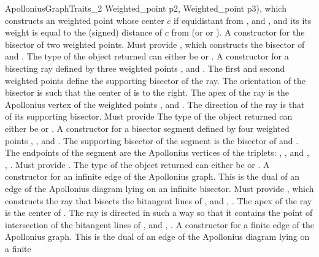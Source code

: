 \begin{ccRefConcept}{ApolloniusGraphTraits_2}
{{Weighted_point p2, Weighted_point p3)}, which constructs an
weighted point whose center $c$ if equidistant from ,  and
, and its its weight is equal to the (signed) distance of $c$
from  (or  or ).}
%
\ccGlue
{}
{A constructor for the bisector of
two weighted points. Must provide , which constructs
the bisector of  and . The type of the object returned
can either be  or .}
%
\ccGlue
{}
{A constructor for a bisecting
ray defined by three weighted points ,  and . 
The first and second weighted points define the supporting bisector of
the ray. The orientation of the bisector is such that the center of
 is to the right. The apex of the ray is the Apollonius vertex
of the weighted points ,  and . The direction
of the ray is that of its supporting bisector.
Must provide 
The type of the object returned can either be  or
.}
%
\ccGlue
{}
{A constructor for a bisector segment defined by four weighted
points , ,  and . The supporting
bisector of the segment is the bisector of  and . The
endpoints of the segment are the Apollonius vertices of the triplets:
, ,  and , , .
Must provide .
The type of the object returned can either be  or
.}
%
\ccGlue
{}
{A constructor for an infinite edge of the Apollonius graph. This is
the dual of an edge of the Apollonius diagram lying on an infinite
bisector. Must provide , which constructs the
ray that bisects the bitangent lines of ,  and
, . The apex of the ray is the center of . The 
ray is directed in such a way so that it contains the point of
intersection of the bitangent lines of ,  and 
, .}
%
\ccGlue
{}
{A constructor for a finite edge of the Apollonius graph. This is the
dual of an edge of the Apollonius diagram lying on a finite
}
\end{ccRefConcept}
